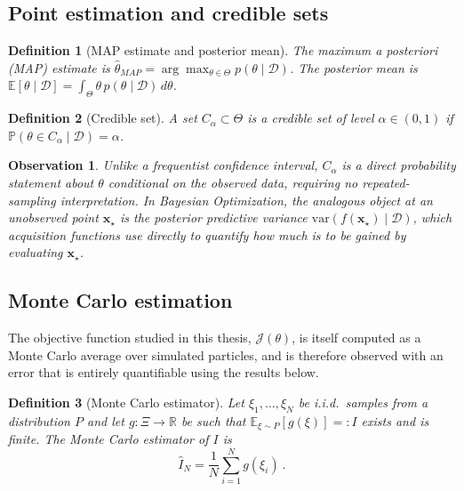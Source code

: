 \documentclass{article}
\newtheorem{defn}{Definition}
\newtheorem{obs}{Observation}
\begin{document}
	\subsection{Point estimation and credible sets}
	
	\begin{defn}[MAP estimate and posterior mean]
		The \textit{maximum a posteriori} (MAP) estimate is $\hat\theta_{MAP} = \arg\max_{\theta \in \Theta} p(\theta \mid \mathcal{D})$. The \textit{posterior mean} is $\mathbb{E}[\theta \mid \mathcal{D}] = \int_\Theta \theta \, p(\theta \mid \mathcal{D}) \, d\theta$.
	\end{defn}
	
	\begin{defn}[Credible set]
		A set $C_\alpha \subset \Theta$ is a \textit{credible set} of level $\alpha \in (0,1)$ if $\mathbb{P}(\theta \in C_\alpha \mid \mathcal{D}) = \alpha$.
	\end{defn}
	
	\begin{obs}
		Unlike a frequentist confidence interval, $C_\alpha$ is a direct probability statement about $\theta$ conditional on the observed data, requiring no repeated-sampling interpretation. In Bayesian Optimization, the analogous object at an unobserved point $\mathbf{x}_\star$ is the posterior predictive variance $\mathrm{var}(f(\mathbf{x}_\star) \mid \mathcal{D})$, which acquisition functions use directly to quantify how much is to be gained by evaluating $\mathbf{x}_\star$.
	\end{obs}
	
	\subsection{Monte Carlo estimation}
	
	The objective function studied in this thesis, $\mathcal{J}(\theta)$, is itself computed as a Monte Carlo average over simulated particles, and is therefore observed with an error that is entirely quantifiable using the results below.
	
	\begin{defn}[Monte Carlo estimator]
		Let $\xi_1, \dots, \xi_N$ be i.i.d.\ samples from a distribution $P$ and let $g: \Xi \to \mathbb{R}$ be such that $\mathbb{E}_{\xi \sim P}[g(\xi)] =: I$ exists and is finite. The \textit{Monte Carlo estimator} of $I$ is
		\begin{equation}
			\hat{I}_N = \frac{1}{N} \sum_{i=1}^N g(\xi_i) \ .
		\end{equation}
	\end{defn}
	
\end{document}
